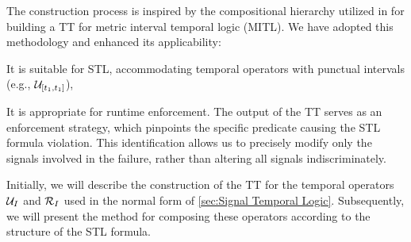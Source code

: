     The construction process is inspired by the compositional hierarchy utilized in \cite{ferrere2019real} for building a TT for metric interval temporal logic (MITL). We have adopted this methodology and enhanced its applicability:
    \begin{enumerate*}[label=(\roman*)]
        \item It is suitable for STL, accommodating temporal operators with punctual intervals (e.g., \(\until_{[t_1,t_1]}\)),
        \item It is appropriate for runtime enforcement. The output of the TT serves as an enforcement strategy, which pinpoints the specific predicate causing the STL formula violation. This identification allows us to precisely modify only the signals involved in the failure, rather than altering all signals indiscriminately.
    \end{enumerate*}
    
    Initially, we will describe the construction of the TT for the temporal operators $\until_I$ and $\release_I$ used in the normal form of \cref{sec:Signal Temporal Logic}. Subsequently, we will present the method for composing these operators according to the structure of the STL formula.
    
    
